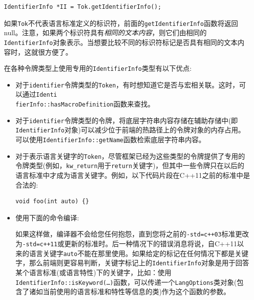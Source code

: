 \begin{lstlisting}[style=styleCXX]
IdentifierInfo *II = Tok.getIdentifierInfo();
\end{lstlisting}

如果\texttt{Tok}不代表语言标准定义的标识符，前面的\texttt{getIdentifierInfo}函数将返回null。注意，如果两个标识符具有\textit{相同的文本内容}，则它们由相同的\texttt{IdentifierInfo}对象表示。当想要比较不同的标识符标记是否具有相同的文本内容时，这就很方便了。

在各种令牌类型上使用专用的\texttt{IdentifierInfo}类型有以下优点:

\begin{itemize}
\item 对于\texttt{identifier}令牌类型的\texttt{Token}，有时想知道它是否与宏相关联。这时，可以通过\texttt{Identi\\fierInfo::hasMacroDefinition}函数来查找。

\item 对于\texttt{identifier}令牌类型的令牌，将底层字符串内容存储在辅助存储中(即\texttt{IdentifierInfo}对象)可以减少位于前端的热路径上的令牌对象的内存占用。可以使用\texttt{IdentifierInfo::getName}函数检索底层字符串内容。

\item 对于表示语言关键字的\texttt{Token}，尽管框架已经为这些类型的令牌提供了专用的令牌类型(例如，\texttt{kw\_return}用于\texttt{return}关键字)，但其中一些令牌只在以后的语言标准中才成为语言关键字。例如，以下代码片段在C++11之前的标准中是合法的:
\begin{lstlisting}[style=styleCXX]
void foo(int auto) {}
\end{lstlisting}

\item 使用下面的命令编译:

如果这样做，编译器不会给您任何抱怨，直到您将之前的\texttt{-std=c++03}标准更改为\texttt{-std=c++11}或更新的标准时。后一种情况下的错误消息将说，自C++11以来的语言关键字\texttt{auto}不能在那里使用。如果给定的标记在任何情况下都是关键字，那么前端则更容易判断，关键字标记上的\texttt{IdentifierInfo}对象是用于回答某个语言标准(或语言特性)下的关键字，比如：使用\texttt{IdentifierInfo::isKeyword(…)}函数，可以传递一个\texttt{LangOptions}类对象(包含了诸如当前使用的语言标准和特性等信息的类)作为这个函数的参数。

\end{itemize}

